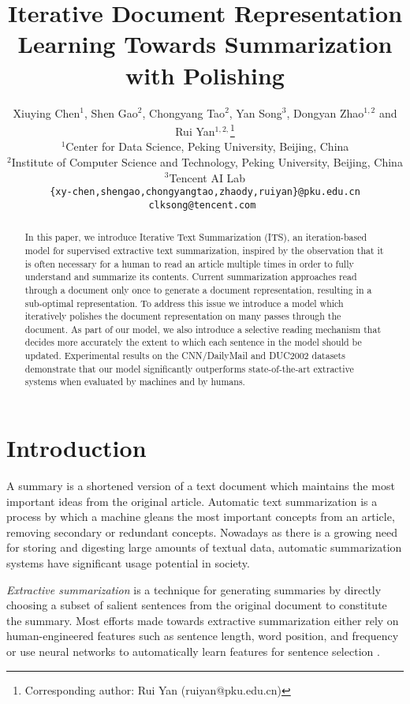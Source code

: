\documentclass[11pt,a4paper]{article}
\title{Iterative Document Representation Learning Towards Summarization with Polishing}
\author{Xiuying Chen$^1$, Shen Gao$^2$, Chongyang Tao$^2$, Yan Song$^{3}$, Dongyan Zhao$^{1,2}$ and Rui Yan$^{1,2,}$\thanks{ Corresponding author: Rui Yan (ruiyan@pku.edu.cn) }\\
 $^1$Center for Data Science, Peking University, Beijing, China\\
 $^2$Institute of Computer Science and Technology, Peking University, Beijing, China\\
 $^3$Tencent AI Lab\\
 \tt \{xy-chen,shengao,chongyangtao,zhaody,ruiyan\}@pku.edu.cn\\
 \tt clksong@tencent.com
  }
\date{}
\begin{document}
\maketitle
\begin{abstract}
In this paper, we introduce Iterative Text Summarization (ITS), an iteration-based model for supervised extractive text summarization, inspired by the observation that it is often necessary for a human to read an article multiple times in order to fully understand and summarize its contents. Current summarization approaches read through a document only once to generate a document representation, resulting in a sub-optimal representation. To address this issue we introduce a model which iteratively polishes the document representation on many passes through the document. As part of our model, we also introduce a selective reading mechanism that decides more accurately the extent to which each sentence in the model should be updated. Experimental results on the CNN/DailyMail and DUC2002 datasets demonstrate that our model significantly outperforms state-of-the-art extractive systems when evaluated by machines and by humans.
\end{abstract}

\section{Introduction}

A summary is a shortened version of a text document which maintains the most important ideas from the original article. Automatic text summarization is a process by which a machine gleans the most important concepts from an article, removing secondary or redundant concepts. 
Nowadays as there is a growing need for storing and digesting large amounts of textual data, automatic summarization systems have significant usage potential in society.

\textit{Extractive summarization} is a technique for generating summaries by directly choosing a subset of salient sentences from the original document to constitute the summary. 
Most efforts made towards extractive summarization either rely on human-engineered features such as sentence length, word position, and frequency \cite{Cohen2002Natural,radev2004mead,Woodsend2010Automatic,Yan2011Summarize,Yan2011Evolutionary,yan2012visualizing} or use neural networks to automatically learn features for sentence selection \cite{Cheng2016Neural,Nallapati2016SummaRuNNer}. 
\end{document}
